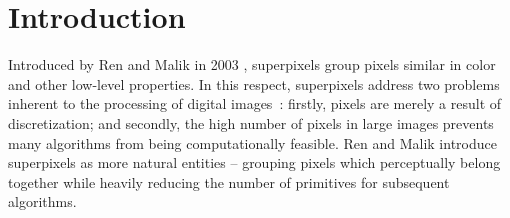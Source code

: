\documentclass[5p]{elsarticle}
\begin{document}
\section{Introduction}
\label{sec:introduction}

Introduced by Ren and Malik in 2003 \cite{RenMalik:2003}, superpixels group pixels
similar in color and other low-level properties. In this respect, superpixels address
two problems inherent to the processing of digital images~\cite{RenMalik:2003}: firstly, pixels are merely a result of discretization;
and secondly, the high number of pixels in large images prevents many algorithms from being
computationally feasible. Ren and Malik introduce superpixels as more natural entities
-- grouping pixels which perceptually belong together while heavily reducing the number of primitives for subsequent algorithms.
\end{document}
